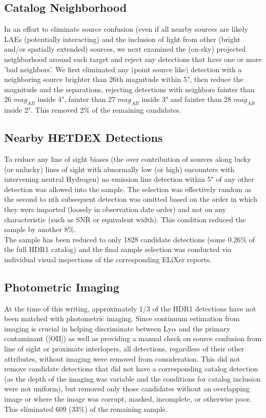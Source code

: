 \documentclass{aastex62}
\begin{document}
\subsection{Catalog Neighborhood}  \label{sec:catalog_neighbors}
In an effort to eliminate source confusion (even if all nearby sources are likely LAEs (potentially interacting) and the inclusion of light from other (bright and/or spatially extended) sources, we next examined the (on-sky) projected neighborhood around each target and reject any detections that have one or more 'bad neighbors'. We first eliminated any (point source like) detection with a neighboring source brighter than 26th magnitude within 5", then reduce the magnitude and the separations, rejecting detections with neighbors fainter than 26 $mag_{AB}$ inside 4", fainter than 27 $mag_{AB}$ inside 3" and fainter than 28 $mag_{AB}$ inside 2". This removed 2\% of the remaining candidates.


\subsection{Nearby HETDEX Detections}
To reduce any line of sight biases (the over contribution of sources along lucky (or unlucky) lines of sight with abnormally low (or high) encounters with intervening neutral Hydrogen) no emission line detection within 5" of any other detection was allowed into the sample. The selection was effectively random as the second to nth subsequent detection was omitted based on the order in which they were imported (loosely in observation date order) and not on any characteristic (such as SNR or equivalent width). This condition reduced the sample by another 8\%.\\

The sample has been reduced to only 1828 candidate detections (some 0.26\% of the full HDR1 catalog) and the final sample selection was conducted via individual visual inspections of the corresponding ELiXer reports.

\subsection{Photometric Imaging}
At the time of this writing, approximately 1/3 of the HDR1 detections have not been matched with photometric imaging. Since continuum estimation from imaging is crucial in helping discriminate between Ly$\alpha$ and the primary contaminant ([OII]) as well as providing a manual check on source confusion from line of sight or proximate interlopers, all detections, regardless of their other attributes, without imaging were removed from consideration. This did not remove candidate detections that did not have a corresponding catalog detection (as the depth of the imaging was variable and the conditions for catalog inclusion were not uniform), but removed only those candidates without an overlapping image or where the image was corrupt, masked, incomplete, or otherwise poor. This eliminated 609 (33\%) of the remaining sample.
\end{document}
